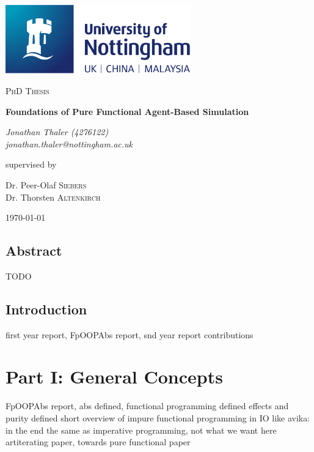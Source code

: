 \documentclass[oneside]{book}
\begin{document}
\begin{titlepage}
	\centering
	\includegraphics[width=0.60\textwidth]{../logo/UoN_Primary_Logo_RGB.png}\par\vspace{1cm}
	{\scshape\Large PhD Thesis\par}
	\vspace{1.5cm}
	{\huge\bfseries Foundations of Pure Functional Agent-Based Simulation\par}
	\vspace{2cm}
	{\Large\itshape Jonathan Thaler (4276122) \\ jonathan.thaler@nottingham.ac.uk \par}
	\vfill
	supervised by\par
	Dr. Peer-Olaf \textsc{Siebers} \\
	Dr. Thorsten \textsc{Altenkirch}

	\vfill

	{\large \today\par}
\end{titlepage}

\cleardoublepage

\section*{Abstract}
TODO

\clearpage
\tableofcontents
\clearpage

\section{Introduction}
first year report,
FpOOPAbs report,
snd year report
contributions

\chapter*{Part I: General Concepts}
FpOOPAbs report,
abs defined,
functional programming defined
effects and purity defined
short overview of impure functional programming in IO like avika: in the end the same as imperative programming, not what we want here
artiterating paper,
towards pure functional paper
\end{document}
